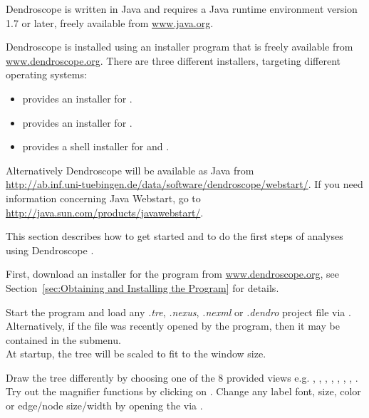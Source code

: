 \documentclass[11pt]{article}
\def\Dendroscope{{\sf Dendroscope }}
\begin{document}
\Dendroscope is written in Java and requires a Java runtime environment
version 1.7 or later, freely available from
\href{http://www.java.org}{www.java.org}. %

\Dendroscope is installed using an installer program that is freely available
from\\
\href{http://www.dendroscope.org}
{www.dendroscope.org}.
There are three different installers, targeting different operating systems:
\begin{itemize}
\item {} provides an installer for .
\item {} provides an installer for .
\item {} provides a shell installer for
 and .
\end{itemize}

Alternatively \Dendroscope will be available as Java  from \\
\href{http://ab.inf.uni-tuebingen.de/data/software/dendroscope/webstart/}{http://ab.inf.uni-tuebingen.de/data/software/dendroscope/webstart/}.
If you need information concerning Java Webstart, go to \href{http://java.sun.com/products/javawebstart/}{http://java.sun.com/products/javawebstart/}.


This section describes how to get started and to do the first steps of analyses 
using \Dendroscope.

First, download an installer for the program from 
\href{http://www.dendroscope.org}
{www.dendroscope.org},
see Section~\ref{sec:Obtaining and Installing the Program}
for details.

Start the program and load any \textit{.tre}, \textit{.nexus}, \textit{.nexml} or \textit{.dendro} 
project file via . Alternatively, if the file
was recently opened by the program, then it may be contained in
the  submenu.\\
At startup, the tree will be scaled to fit to the window size. 

Draw the tree differently by choosing one of the 8 provided views e.g. 
,
,
,
,
,
,
,
.
Try out the magnifier functions by clicking on .
Change any label font, size, color or edge/node size/width by opening the  
via .
\end{document}
